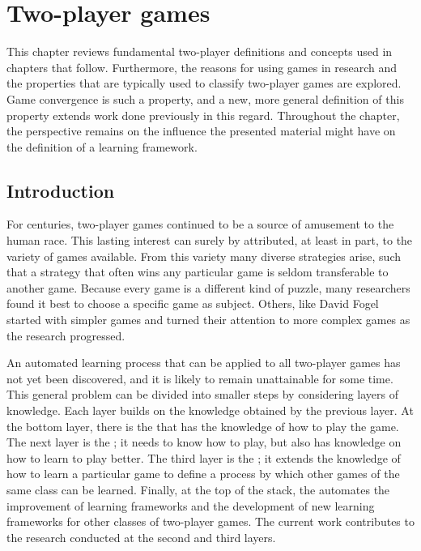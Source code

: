 \chapter{Two-player games}
\label{chap:two-player}
{ \chapterintro
This chapter reviews fundamental two-player definitions and concepts used in chapters that follow.  Furthermore, the reasons for using games in research and the properties that are typically used to classify two-player games are explored. Game convergence is such a property, and a new, more general definition of this property extends work done previously in this regard.  Throughout the chapter, the perspective remains on the influence the presented material might have on the definition of a learning framework.}

\section{Introduction}
\label{sec:two-player-intro}
For centuries, two-player games continued to be a source of amusement to the human race.  This lasting interest can surely by attributed, at least in part, to the variety of games available.  From this variety many diverse strategies arise, such that a strategy that often wins any particular game is seldom transferable to another game. Because every game is a different kind of puzzle, many researchers found it best to choose a specific game as subject. Others, like David Fogel \cite{fogel:networks,fogel:edge,fogel:chess}  started with simpler games and turned their attention to more complex games as the research progressed. 

An automated learning process that can be applied to all two-player games has not yet been discovered, and it is likely to remain unattainable for some time. This general problem can be divided into smaller steps by considering layers of knowledge. Each layer builds on the knowledge obtained by the previous layer.  At the bottom layer, there is the  that has the knowledge of how to play the game.  The next layer is the ; it needs to know how to play, but also has knowledge on how to learn to play better. The third layer is the ; it extends the knowledge of how to learn a particular game to define a process by which other games of the same class can be learned.  Finally, at the top of the stack, the  automates the improvement of learning frameworks and the development of new learning frameworks for other classes of two-player games. The current work contributes to the research conducted at the second and third layers. 
 
